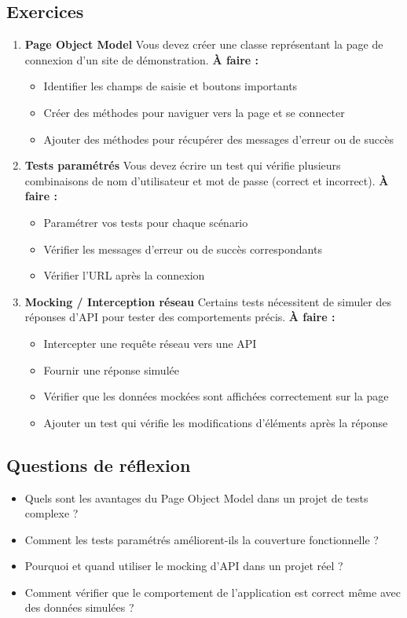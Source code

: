 \documentclass[a4paper,12pt]{article}
\begin{document}
\subsection*{Exercices}
\begin{enumerate}
\item \textbf{Page Object Model}  
Vous devez créer une classe représentant la page de connexion d’un site de démonstration.  
\textbf{À faire :}  
\begin{itemize}
\item Identifier les champs de saisie et boutons importants
\item Créer des méthodes pour naviguer vers la page et se connecter
\item Ajouter des méthodes pour récupérer des messages d’erreur ou de succès
\end{itemize}

\item \textbf{Tests paramétrés}  
Vous devez écrire un test qui vérifie plusieurs combinaisons de nom d’utilisateur et mot de passe (correct et incorrect).  
\textbf{À faire :}  
\begin{itemize}
\item Paramétrer vos tests pour chaque scénario
\item Vérifier les messages d’erreur ou de succès correspondants
\item Vérifier l’URL après la connexion
\end{itemize}

\item \textbf{Mocking / Interception réseau}  
Certains tests nécessitent de simuler des réponses d’API pour tester des comportements précis.  
\textbf{À faire :}  
\begin{itemize}
\item Intercepter une requête réseau vers une API
\item Fournir une réponse simulée
\item Vérifier que les données mockées sont affichées correctement sur la page
\item Ajouter un test qui vérifie les modifications d’éléments après la réponse
\end{itemize}
\end{enumerate}

\subsection*{Questions de réflexion}
\begin{itemize}
\item Quels sont les avantages du Page Object Model dans un projet de tests complexe ?
\item Comment les tests paramétrés améliorent-ils la couverture fonctionnelle ?
\item Pourquoi et quand utiliser le mocking d’API dans un projet réel ?
\item Comment vérifier que le comportement de l’application est correct même avec des données simulées ?
\end{itemize}
\end{document}
